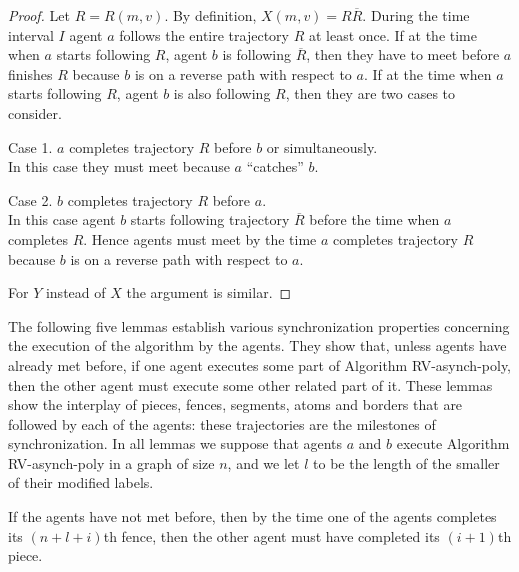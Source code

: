 \documentclass [11pt] {article}
\begin{document}
 \begin{proof}
 Let $R=R(m,v)$. By definition, $X(m,v)=R\overline{R}$. During the time interval $I$ agent $a$ follows the entire trajectory $R$ at least once.
 If at the time when $a$ starts following $R$, agent $b$ is following $\overline{R}$, then they have to meet before $a$ finishes ${R}$ because $b$
is on a reverse path with respect to $a$. If at the time when $a$ starts following $R$, agent $b$ is also following ${R}$, then they are two cases to consider.

Case 1. ${a}$ completes trajectory $R$ before $b$ or simultaneously.\\ In this case they must meet because $a$ ``catches'' $b$.

Case 2.  $b$ completes trajectory $R$ before $a$.\\ In this case agent $b$ starts following trajectory $\overline{R}$ before  the time when $a$ completes $R$.
Hence agents must meet by the time $a$ completes trajectory $R$ because $b$ is on a reverse path with respect to $a$. 

For $Y$ instead of $X$ the argument is similar.
 \end{proof}


The following five lemmas establish various synchronization properties concerning the execution of the algorithm by the agents. 
They show that, unless agents have already met before, if one agent executes some part of  
Algorithm RV-asynch-poly, then the other agent must execute some other related part of it. These lemmas show the interplay of pieces, fences, segments,
atoms and borders that are followed by each of the agents:
these trajectories are the milestones of synchronization. In all lemmas we
suppose that agents $a$ and $b$ execute Algorithm RV-asynch-poly in a graph of size $n$, and we let $l$ to be the length of the smaller of their modified labels.  

\begin{lemma}
\label{lem:1}
If the agents have not met before, then by the time one of the agents completes its  $(n+l+i)$th fence, then the other agent must have completed its $(i+1)$th piece.
\end{lemma}
\end{document}
